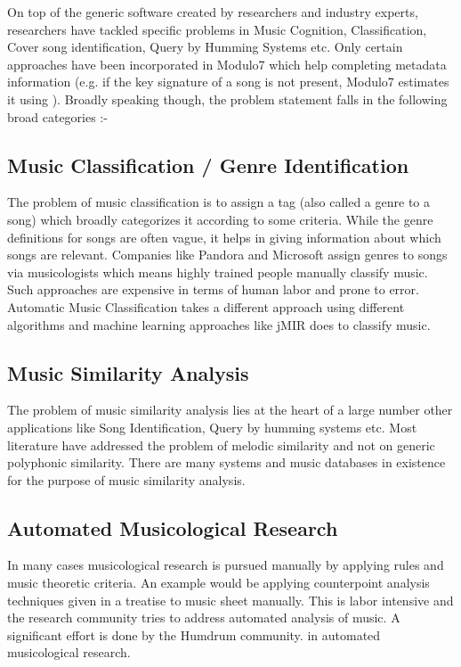 \noindent On top of the generic software created by researchers and industry experts, researchers have tackled specific problems in Music Cognition, Classification, Cover song identification, Query by Humming Systems etc. Only certain approaches have been incorporated in Modulo7 which help completing metadata information (e.g. if the key signature of a song is not present, Modulo7 estimates it using ). Broadly speaking though, the problem statement falls in the following broad categories :- 

\subsection{Music Classification / Genre Identification}

\noindent The problem of music classification is to assign a tag (also called a genre to a song) which broadly categorizes it according to some criteria. While the genre definitions for songs are often vague, it helps in giving information about which songs are relevant. Companies like Pandora and Microsoft assign genres to songs via musicologists \cite{genreclassification} which means highly trained people manually classify music. Such approaches are expensive in terms of human labor and prone to error. Automatic Music Classification takes a different approach using different algorithms and machine learning approaches like jMIR \cite{jMIR} does to classify music. 

\subsection{Music Similarity Analysis}

\noindent The problem of music similarity analysis lies at the heart of a large number other applications like Song Identification, Query by humming systems etc. Most literature have addressed the problem of melodic similarity \cite{simsurvey} and not on generic polyphonic similarity. There are many systems and music databases in existence for the purpose of music similarity analysis.

\subsection{Automated Musicological Research}

\noindent In many cases musicological research is pursued manually by applying rules and music theoretic criteria. An example would be applying counterpoint analysis techniques given in a treatise \cite{theorytreatise} to music sheet manually. This is labor intensive and the research community tries to address automated analysis of music. A significant effort is done by the Humdrum community. \cite{humdrum} in automated musicological research. 

